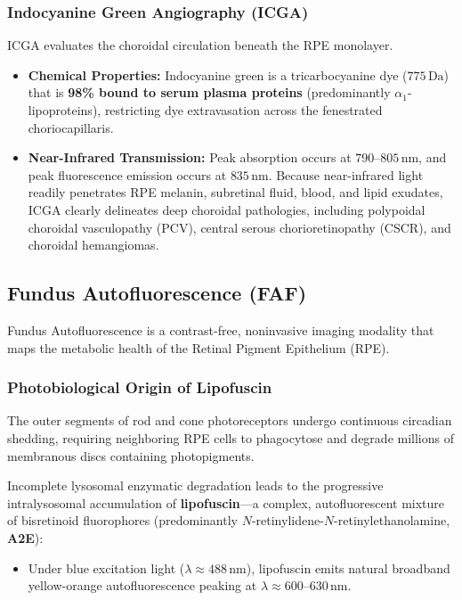\documentclass[11pt,a4paper]{article}
\begin{document}
\subsubsection{Indocyanine Green Angiography (ICGA)}
ICGA evaluates the choroidal circulation beneath the RPE monolayer.
\begin{itemize}[leftmargin=*]
    \item \textbf{Chemical Properties:} Indocyanine green is a tricarbocyanine dye ($775\,\text{Da}$) that is \textbf{98\% bound to serum plasma proteins} (predominantly $\alpha_1$-lipoproteins), restricting dye extravasation across the fenestrated choriocapillaris.
    \item \textbf{Near-Infrared Transmission:} Peak absorption occurs at $790\text{--}805\,\text{nm}$, and peak fluorescence emission occurs at $835\,\text{nm}$. Because near-infrared light readily penetrates RPE melanin, subretinal fluid, blood, and lipid exudates, ICGA clearly delineates deep choroidal pathologies, including polypoidal choroidal vasculopathy (PCV), central serous chorioretinopathy (CSCR), and choroidal hemangiomas.
\end{itemize}

\subsection{Fundus Autofluorescence (FAF)}

Fundus Autofluorescence is a contrast-free, noninvasive imaging modality that maps the metabolic health of the Retinal Pigment Epithelium (RPE).

\subsubsection{Photobiological Origin of Lipofuscin}
The outer segments of rod and cone photoreceptors undergo continuous circadian shedding, requiring neighboring RPE cells to phagocytose and degrade millions of membranous discs containing photopigments. 

Incomplete lysosomal enzymatic degradation leads to the progressive intralysosomal accumulation of \textbf{lipofuscin}—a complex, autofluorescent mixture of bisretinoid fluorophores (predominantly $N$-retinylidene-$N$-retinylethanolamine, \textbf{A2E}):
\begin{itemize}[leftmargin=*]
    \item Under blue excitation light ($\lambda \approx 488\,\text{nm}$), lipofuscin emits natural broadband yellow-orange autofluorescence peaking at $\lambda \approx 600\text{--}630\,\text{nm}$.
\end{itemize}
\end{document}
